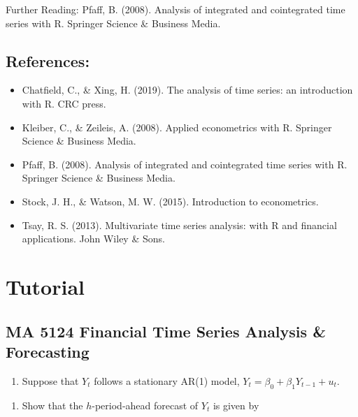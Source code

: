 \documentclass[]{book}
\providecommand{\tightlist}{%
  \setlength{\itemsep}{0pt}\setlength{\parskip}{0pt}}
\begin{document}
Further Reading: Pfaff, B. (2008). Analysis of integrated and cointegrated time series with R. Springer Science \& Business Media.

\hypertarget{references-3}{%
\section{References:}\label{references-3}}

\begin{itemize}
\item
  Chatfield, C., \& Xing, H. (2019). The analysis of time series: an introduction with R. CRC press.
\item
  Kleiber, C., \& Zeileis, A. (2008). Applied econometrics with R. Springer Science \& Business Media.
\item
  Pfaff, B. (2008). Analysis of integrated and cointegrated time series with R. Springer Science \& Business Media.
\item
  Stock, J. H., \& Watson, M. W. (2015). Introduction to econometrics.
\item
  Tsay, R. S. (2013). Multivariate time series analysis: with R and financial applications. John Wiley \& Sons.
\end{itemize}

\hypertarget{tutorial}{%
\chapter*{Tutorial}\label{tutorial}}

\hypertarget{ma-5124-financial-time-series-analysis-forecasting}{%
\section*{MA 5124 Financial Time Series Analysis \& Forecasting}\label{ma-5124-financial-time-series-analysis-forecasting}}


\begin{enumerate}
\def\labelenumi{\arabic{enumi}.}
\tightlist
\item
  Suppose that \(Y_t\) follows a stationary AR(1) model, \(Y_t = \beta_0 + \beta_1Y_{t - 1} + u_t\).
\end{enumerate}

\begin{enumerate}
\def\labelenumi{\alph{enumi}.}
\tightlist
\item
  Show that the \(h\)-period-ahead forecast of \(Y_t\) is given by
\end{enumerate}
\end{document}

